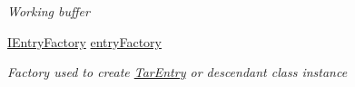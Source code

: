 \begin{DoxyCompactItemize}
\begin{DoxyCompactList}\small\item\em Working buffer \end{DoxyCompactList}\item 
\hyperlink{interface_i_c_sharp_code_1_1_sharp_zip_lib_1_1_tar_1_1_tar_input_stream_1_1_i_entry_factory}{I\+Entry\+Factory} \hyperlink{class_i_c_sharp_code_1_1_sharp_zip_lib_1_1_tar_1_1_tar_input_stream_af4bb424ce3ff60281c217b17e8171b71}{entry\+Factory}
\begin{DoxyCompactList}\small\item\em Factory used to create \hyperlink{class_i_c_sharp_code_1_1_sharp_zip_lib_1_1_tar_1_1_tar_entry}{Tar\+Entry} or descendant class instance \end{DoxyCompactList}\end{DoxyCompactItemize}
